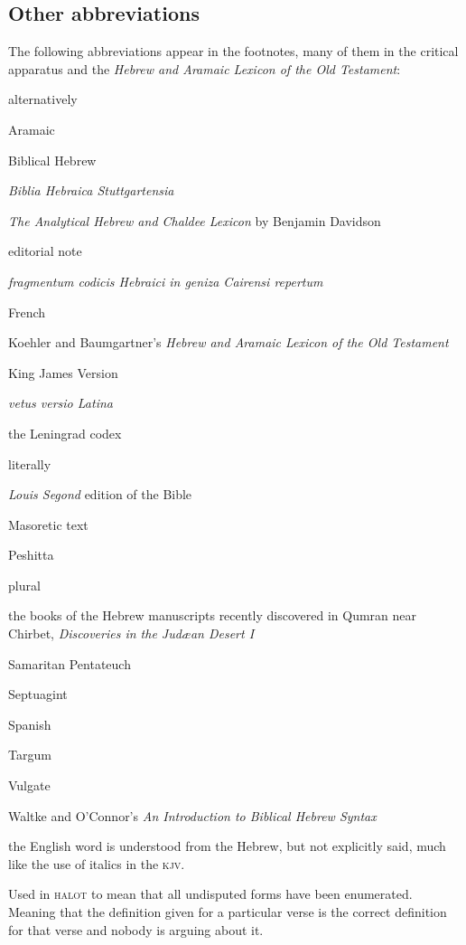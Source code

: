\subsection{Other abbreviations}
The following abbreviations appear in the footnotes, many of them in the critical apparatus and the \textit{Hebrew and Aramaic Lexicon of the Old Testament}:
\begin{description}[labelsep=3em, font=\normalfont, itemsep=-0.25em]
    \item[\textsc{alt}] alternatively
    \item[Aram.] Aramaic
    \item[\textsc{bh}] Biblical Hebrew
    \item[\textsc{bhs}] \textit{Biblia Hebraica Stuttgartensia}
    \item[Davidson] \textit{The Analytical Hebrew and Chaldee Lexicon} by Benjamin Davidson
    \item[\textsc{ed}] editorial note
    \item[\fragheb] \textit{fragmentum codicis Hebraici in geniza Cairensi repertum}
    \item[Fr.] French
    \item[\textsc{halot}] Koehler and Baumgartner's \textit{Hebrew and Aramaic Lexicon of the Old Testament}
    \item[\textsc{kjv}] King James Version
    \item[\latina] \textit{vetus versio Latina}
    \item[L] the Leningrad codex
    \item[\textsc{lit}] literally
    \item[\textsc{lsg}] \textit{Louis Segond} edition of the Bible
    \item[\masoretic] Masoretic text
    \item[\peshitta] Peshitta
    \item[pl.] plural
    \item[\qumran] the books of the Hebrew manuscripts recently discovered in Qumran near Chirbet, \textit{Discoveries in the Jud\ae an Desert I}
    \item[\sampen] Samaritan Pentateuch
    \item[\septuagint] Septuagint
    \item[Sp.] Spanish
    \item[\targum] Targum
    \item[\vulgate] Vulgate
    \item [W\&O] Waltke and O'Connor's \textit{An Introduction to Biblical Hebrew Syntax}
    \item[\textsc{und}] the English word is understood from the Hebrew, but not explicitly said, much like the use of italics in the \textsc{kjv}.
    \item[\hadagger] Used in \textsc{halot} to mean that all undisputed forms have been enumerated. Meaning that the definition given for a particular verse is the correct definition for that verse and nobody is arguing about it.
\end{description}

